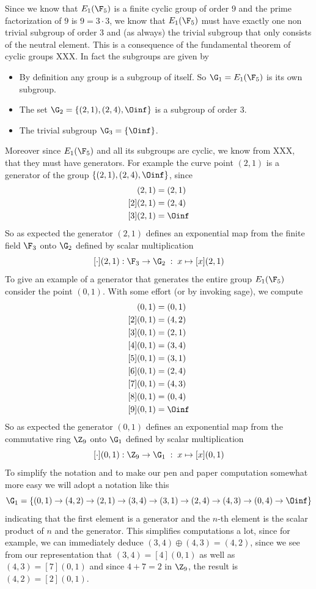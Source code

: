 \begin{example}
Since we know that $E_1(\F_5)$ is a finite cyclic group of order $9$ and the prime factorization of $9$ is $9=3\cdot 3$, we know that $E_1(\F_5)$ must have exactly one non trivial subgroup of order $3$ and (as always) the trivial subgroup that only consists of the neutral element. This is a consequence of the fundamental theorem of cyclic groups XXX. In fact the subgroups are given by
\begin{itemize}
\item By definition any group is a subgroup of itself. So 
$\G_1 = E_1(\F_5)$ is its own subgroup.
\item The set $\G_2 = \{(2,1),(2,4),\Oinf\}$ is a subgroup of order $3$.
\item The trivial subgroup $\G_3 = \{\Oinf\}$.
\end{itemize}
Moreover since $E_1(\F_5)$ and all its subgroups are cyclic, we know from XXX, that they must have generators. For example the curve point $(2,1)$ is a generator of the group $\{(2,1),(2,4),\Oinf\}$, since 
\begin{align*}
[1](2,1) & = (2,1) \\
[2](2,1) & = (2,4) \\
[3](2,1) & = \Oinf
\end{align*}
So as expected the generator $(2,1)$ defines an exponential map from the finite field $\F_3$ onto $\G_2$ defined by scalar multiplication
$$
[\cdot](2,1): \F_3 \to \G_2\; : \; x\mapsto [x](2,1) 
$$
To give an example of a generator that generates the entire group $E_1(\F_5)$ consider the point $(0,1)$. With some effort (or by invoking sage), we compute
\begin{align*}
[1](0,1) & = (0, 1)\\
[2](0,1) & = (4, 2)\\
[3](0,1) & = (2, 1)\\
[4](0,1) & = (3, 4)\\
[5](0,1) & = (3, 1)\\
[6](0,1) & = (2, 4)\\
[7](0,1) & = (4, 3)\\
[8](0,1) & = (0, 4)\\
[9](0,1) & = \Oinf
\end{align*}
So as expected the generator $(0,1)$ defines an exponential map from the commutative ring $\Z_9$ onto $\G_1$ defined by scalar multiplication
$$
[\cdot](0,1): \Z_9 \to \G_1\; : \; x\mapsto [x](0,1) 
$$
To simplify the notation and to make our pen and paper computation somewhat more easy we will adopt a notation like this 
$$
\G_1 = \{(0, 1)\to (4, 2)\to (2, 1)\to (3, 4)\to (3, 1)\to (2, 4)\to (4, 3)\to (0, 4)\to \Oinf \}
$$
indicating that the first element is a generator and the $n$-th element is the scalar product of $n$ and the generator. This simplifies computations a lot, since for example, we can immediately deduce $(3,4)\oplus (4,3) = (4,2)$, since 
we see from our representation that $(3,4)= [4](0,1)$ as well as $(4,3)= [7](0,1)$ and since $4+7 = 2$ in $\Z_9$, the result is $(4,2)=[2](0,1)$.


\end{example}
